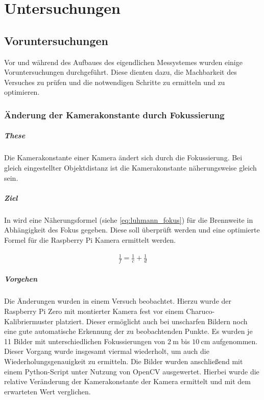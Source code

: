 \documentclass[./00PhotoBox.tex]{subfiles}
\begin{document}
\chapter{Untersuchungen}

\section{Voruntersuchungen}
Vor und während des Aufbaues des eigendlichen Messystemes wurden einige Voruntersuchungen durchgeführt. Diese dienten dazu, die Machbarkeit des Versuches zu prüfen und die notwendigen Schritte zu ermitteln und zu optimieren.




\subsection{Änderung der Kamerakonstante durch Fokussierung}

\paragraph{These}
Die Kamerakonstante einer Kamera ändert sich durch die Fokussierung. Bei gleich eingestellter Objektdistanz ist die Kamerakonstante näherungsweise gleich sein.

\paragraph{Ziel}
In \citet[S. 146]{luhmann} wird eine Näherungsformel (siehe \autoref{eq:luhmann_fokus}) für die \Gls{Brennweite} in Abhängigkeit des Fokus gegeben. Diese soll überprüft werden und eine optimierte Formel für die Raspberry Pi Kamera ermittelt werden.

\begin{align}
    \frac{1}{f} = \frac{1}{c} + \frac{1}{d}
    \label{eq:luhmann_fokus}
\end{align}

\paragraph{Vorgehen}
Die Änderungen wurden in einem Versuch beobachtet. Hierzu wurde der Raspberry Pi Zero mit montierter Kamera fest vor einem Charuco-Kalibriermuster platziert. Dieser ermöglicht auch bei unscharfen Bildern noch eine gute automatische Erkennung der zu beobachtenden Punkte. Es wurden je 11 Bilder mit unterschiedlichen Fokussierungen von $2~\text{m}$ bis  $10~\text{cm}$ aufgenommen. Dieser Vorgang wurde insgesamt viermal wiederholt, um auch die Wiederholungsgenauigkeit zu ermitteln. Die Bilder wurden anschließend mit einem Python-Script unter Nutzung von OpenCV ausgewertet. Hierbei wurde die relative Veränderung der Kamerakonstante der Kamera ermittelt und mit dem erwarteten Wert verglichen.
\end{document}
